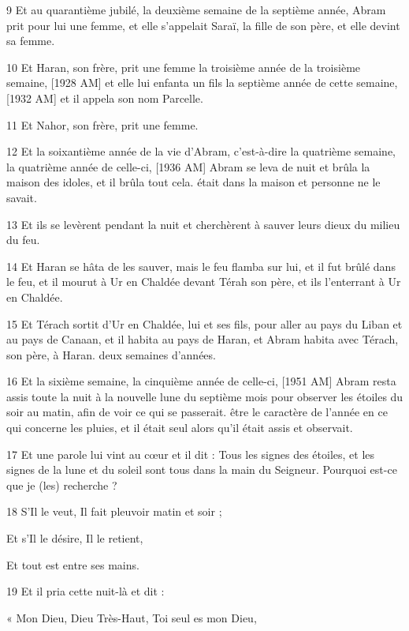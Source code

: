 \par 9 Et au quarantième jubilé, la deuxième semaine de la septième année, Abram prit pour lui une femme, et elle s'appelait Saraï, la fille de son père, et elle devint sa femme.
\par 10 Et Haran, son frère, prit une femme la troisième année de la troisième semaine, [1928 AM] et elle lui enfanta un fils la septième année de cette semaine, [1932 AM] et il appela son nom Parcelle.
\par 11 Et Nahor, son frère, prit une femme.
\par 12 Et la soixantième année de la vie d'Abram, c'est-à-dire la quatrième semaine, la quatrième année de celle-ci, [1936 AM] Abram se leva de nuit et brûla la maison des idoles, et il brûla tout cela. était dans la maison et personne ne le savait.
\par 13 Et ils se levèrent pendant la nuit et cherchèrent à sauver leurs dieux du milieu du feu.
\par 14 Et Haran se hâta de les sauver, mais le feu flamba sur lui, et il fut brûlé dans le feu, et il mourut à Ur en Chaldée devant Térah son père, et ils l'enterrant à Ur en Chaldée.
\par 15 Et Térach sortit d'Ur en Chaldée, lui et ses fils, pour aller au pays du Liban et au pays de Canaan, et il habita au pays de Haran, et Abram habita avec Térach, son père, à Haran. deux semaines d'années.
\par 16 Et la sixième semaine, la cinquième année de celle-ci, [1951 AM] Abram resta assis toute la nuit à la nouvelle lune du septième mois pour observer les étoiles du soir au matin, afin de voir ce qui se passerait. être le caractère de l'année en ce qui concerne les pluies, et il était seul alors qu'il était assis et observait.
\par 17 Et une parole lui vint au cœur et il dit : Tous les signes des étoiles, et les signes de la lune et du soleil sont tous dans la main du Seigneur. Pourquoi est-ce que je (les) recherche ?
\par    
\par 18 S'Il le veut, Il fait pleuvoir matin et soir ;  
\par     Et s’Il le désire, Il le retient,  
\par     Et tout est entre ses mains.
\par    
\par 19 Et il pria cette nuit-là et dit :  
\par     « Mon Dieu, Dieu Très-Haut, Toi seul es mon Dieu,  
